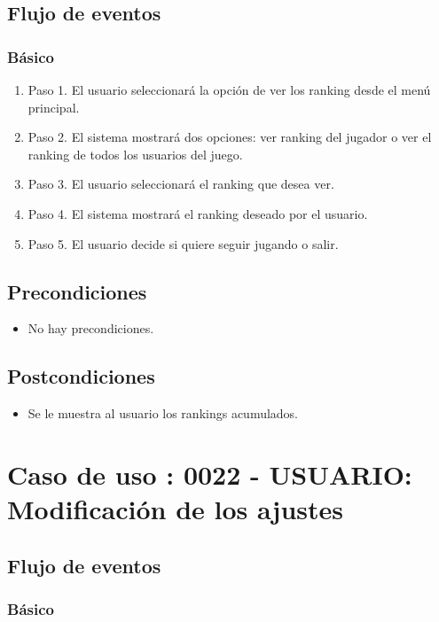 \subsection{Flujo de eventos}
\subsubsection{Básico}

\begin{enumerate}
\item Paso 1.
El usuario seleccionará la opción de ver los ranking desde el menú principal. 
\item Paso 2.
El sistema mostrará dos opciones: ver ranking del jugador o ver el ranking de todos los usuarios del juego.
\item Paso 3.
El usuario seleccionará el ranking que desea ver.
\item Paso 4.
El sistema mostrará el ranking deseado por el usuario.
\item Paso 5.
El usuario decide si quiere seguir jugando o salir.
\end{enumerate}

\subsection{Precondiciones}
\begin{itemize}
\item No hay precondiciones.
\end{itemize}

\subsection{Postcondiciones}
\begin{itemize}
\item Se le muestra al usuario los rankings acumulados. 
\end{itemize}



\section{Caso de uso : 0022 - USUARIO: Modificación de los ajustes}\label{sec:uc0}
\subsection{Flujo de eventos}
\subsubsection{Básico}

